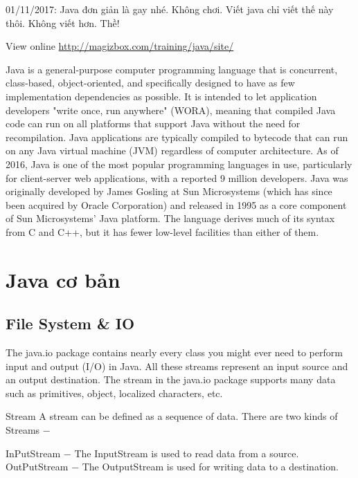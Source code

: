 01/11/2017: Java đơn giản là gay nhé. Không chơi. Viết java chỉ viết thế này thôi. Không viết hơn. Thề!

View online \href{http://magizbox.com/training/java/site/}{http://magizbox.com/training/java/site/}

Java is a general-purpose computer programming language that is concurrent, class-based, object-oriented, and specifically designed to have as few implementation dependencies as possible. It is intended to let application developers "write once, run anywhere" (WORA), meaning that compiled Java code can run on all platforms that support Java without the need for recompilation. Java applications are typically compiled to bytecode that can run on any Java virtual machine (JVM) regardless of computer architecture. As of 2016, Java is one of the most popular programming languages in use, particularly for client-server web applications, with a reported 9 million developers. Java was originally developed by James Gosling at Sun Microsystems (which has since been acquired by Oracle Corporation) and released in 1995 as a core component of Sun Microsystems' Java platform. The language derives much of its syntax from C and C++, but it has fewer low-level facilities than either of them.


\part{Java cơ bản}










\chapter{File System & IO}

The java.io package contains nearly every class you might ever need to perform input and output (I/O) in Java. All these streams represent an input source and an output destination. The stream in the java.io package supports many data such as primitives, object, localized characters, etc.

Stream
A stream can be defined as a sequence of data. There are two kinds of Streams −

InPutStream − The InputStream is used to read data from a source.
OutPutStream − The OutputStream is used for writing data to a destination.


